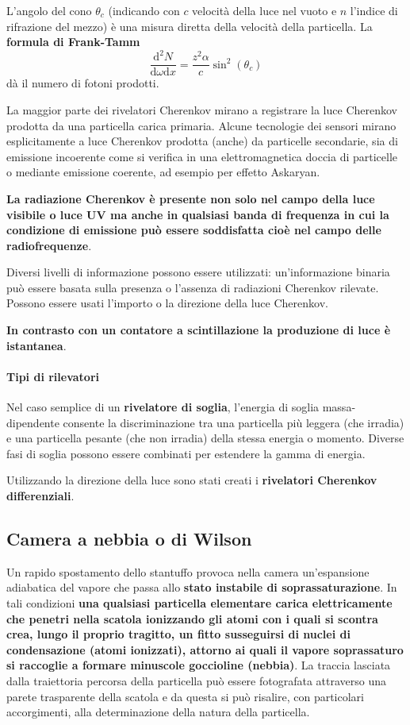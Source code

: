 \documentclass[a4paper,11pt,twoside,openany]{book}
\theoremstyle{definition}
\theoremstyle{plain}
\theoremstyle{plain}
\theoremstyle{definition}
\begin{document}
L'angolo del cono $\theta_c$ (indicando con $c$ velocità della luce nel vuoto e $n$ l'indice di rifrazione del mezzo) è una misura diretta della velocità della particella. La \textbf{formula di Frank-Tamm} $$\frac{\textrm{d}^2N}{\textrm{d} \omega \textrm{d}x} = \frac{z^2\alpha}{c} \sin^2 (\theta_c)$$ dà il numero di fotoni prodotti.

La maggior parte dei rivelatori Cherenkov mirano a registrare la luce Cherenkov prodotta da una particella carica primaria. Alcune tecnologie dei sensori mirano esplicitamente a luce Cherenkov prodotta (anche) da particelle secondarie, sia di emissione incoerente come si verifica in una elettromagnetica doccia di particelle o mediante emissione coerente, ad esempio per effetto Askaryan.

\textbf{La radiazione Cherenkov è presente non solo nel campo della luce visibile o luce UV ma anche in qualsiasi banda di frequenza in cui la condizione di emissione può essere soddisfatta cioè nel campo delle radiofrequenze}.

Diversi livelli di informazione possono essere utilizzati: un'informazione binaria può essere basata sulla presenza o l'assenza di radiazioni Cherenkov rilevate. Possono essere usati l'importo o la direzione della luce Cherenkov.

\textbf{In contrasto con un contatore a scintillazione la produzione di luce è istantanea}.

\paragraph{Tipi di rilevatori} Nel caso semplice di un \textbf{rivelatore di soglia}, l'energia di soglia massa-dipendente consente la discriminazione tra una particella più leggera (che irradia) e una particella pesante (che non irradia) della stessa energia o momento. Diverse fasi di soglia possono essere combinati per estendere la gamma di energia.

Utilizzando la direzione della luce sono stati creati i \textbf{rivelatori Cherenkov differenziali}.

\subsection{Camera a nebbia o di Wilson} %
Un rapido spostamento dello stantuffo provoca nella camera un'espansione adiabatica del vapore che passa allo \textbf{stato instabile di soprassaturazione}. In tali condizioni \textbf{una qualsiasi particella elementare carica elettricamente che penetri nella scatola ionizzando gli atomi con i quali si scontra crea, lungo il proprio tragitto, un fitto susseguirsi di nuclei di condensazione (atomi ionizzati), attorno ai quali il vapore soprassaturo si raccoglie a formare minuscole goccioline (nebbia)}.
La traccia lasciata dalla traiettoria percorsa della particella può essere fotografata attraverso una parete trasparente della scatola e da questa si può risalire, con particolari accorgimenti, alla determinazione della natura della particella.
\end{document}
